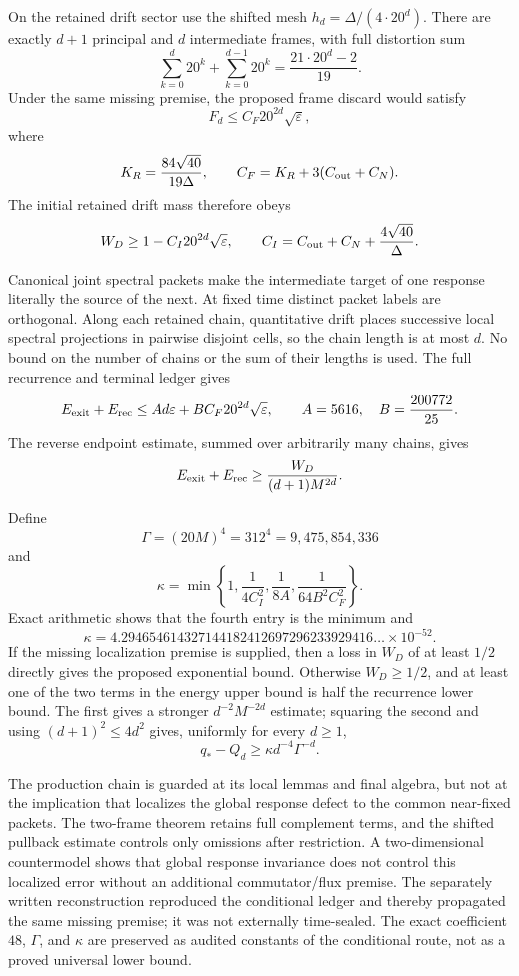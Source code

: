 \documentclass[11pt]{article}
\begin{document}
On the retained drift sector use the shifted mesh
$h_d=\Delta/(4\cdot20^d)$.  There are exactly $d+1$ principal and $d$
intermediate frames, with full distortion sum
\[
 \sum_{k=0}^{d}20^k+\sum_{k=0}^{d-1}20^k
 =\frac{21\cdot20^d-2}{19}.
\]
Under the same missing premise, the proposed frame discard would satisfy
\[
 F_d\le C_F20^{2d}\sqrt\varepsilon,
\]
where
\[
 K_R=\frac{84\sqrt{40}}{19\Delta},\qquad
 C_F=K_R+3(C_{\rm out}+C_N).
\]
The initial retained drift mass therefore obeys
\[
 W_D\ge1-C_I20^{2d}\sqrt\varepsilon,\qquad
 C_I=C_{\rm out}+C_N+\frac{4\sqrt{40}}{\Delta}.
\]

Canonical joint spectral packets make the intermediate target of one response
literally the source of the next.  At fixed time distinct packet labels are
orthogonal.  Along each retained chain, quantitative drift places successive
local spectral projections in pairwise disjoint cells, so the chain length is
at most $d$.  No bound on the number of chains or the sum of their lengths is
used.  The full recurrence and terminal ledger gives
\[
 E_{\rm exit}+E_{\rm rec}
 \le A d\varepsilon+B C_F20^{2d}\sqrt\varepsilon,
 \qquad A=5616,\quad B=\frac{200772}{25}.
\]
The reverse endpoint estimate, summed over arbitrarily many chains, gives
\[
 E_{\rm exit}+E_{\rm rec}
 \ge \frac{W_D}{(d+1)M^{2d}}.
\]

Define
\[
 \Gamma=(20M)^4=312^4=9{,}475{,}854{,}336
\]
and
\[
 \kappa=\min\left\{
 1,\frac1{4C_I^2},\frac1{8A},\frac1{64B^2C_F^2}
 \right\}.
\]
Exact arithmetic shows that the fourth entry is the minimum and
\[
 \kappa=4.294654614327144182412697296233929416\ldots\times10^{-52}.
\]
If the missing localization premise is supplied, then a loss in $W_D$ of at
least $1/2$ directly gives the proposed exponential bound. Otherwise
$W_D\ge1/2$, and at least one of the two terms in
the energy upper bound is half the recurrence lower bound.  The first gives a
stronger $d^{-2}M^{-2d}$ estimate; squaring the second and using
$(d+1)^2\le4d^2$ gives, uniformly for every $d\ge1$,
\[
 q_*-Q_d\ge\kappa d^{-4}\Gamma^{-d}.
\]

The production chain is guarded at its local lemmas and final algebra, but not
at the implication that localizes the global response defect to the common
near-fixed packets. The two-frame theorem retains full complement terms, and
the shifted pullback estimate controls only omissions after restriction. A
two-dimensional countermodel shows that global response invariance does not
control this localized error without an additional commutator/flux premise.
The separately written reconstruction reproduced the conditional ledger and
thereby propagated the same missing premise; it was not externally time-sealed.
The exact coefficient $48$, $\Gamma$, and $\kappa$ are preserved as audited
constants of the conditional route, not as a proved universal lower bound.
\end{document}
